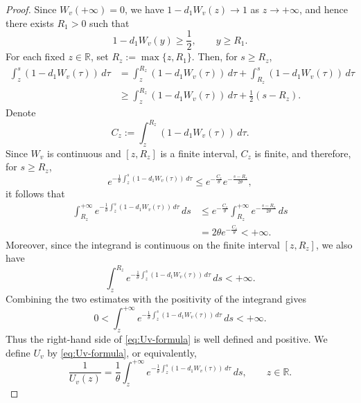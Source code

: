\documentclass[preprint,sort&compress,final,12pt]{elsarticle}
\numberwithin{equation}{section}
\begin{document}
\begin{proof}
Since $W_v(+\infty)=0$, we have $1-d_1W_v(z)\to1$ as $z\to+\infty$, and hence there exists $R_1>0$ such that
\begin{equation*}
1-d_1W_v(y)\ge\frac12,\qquad y\ge R_1.
\end{equation*}
For each fixed $z\in\mathbb R$, set $R_z:=\max\{z,R_1\}$. Then, for $s\ge R_z$,
\begin{align*}
\int_z^s(1-d_1W_v(\tau))\,d\tau
&=\int_z^{R_z}(1-d_1W_v(\tau))\,d\tau+
\int_{R_z}^s(1-d_1W_v(\tau))\,d\tau\\
&\ge \int_z^{R_z}(1-d_1W_v(\tau))\,d\tau
+\frac12(s-R_z).
\end{align*}
Denote
\begin{equation*}
C_z:=\int_z^{R_z}(1-d_1W_v(\tau))\,d\tau.
\end{equation*}
Since $W_v$ is continuous and $[z,R_z]$ is a finite interval, $C_z$ is finite, and therefore, for $s\ge R_z$,
\begin{equation*}
e^{-\frac{1}{\theta}\int_z^s(1-d_1W_v(\tau))\,d\tau}\le
e^{-\frac{C_z}{\theta}}e^{-\frac{s-R_z}{2\theta}},
\end{equation*}
it follows that
\begin{align*}
\int_{R_z}^{+\infty}e^{-\frac{1}{\theta}\int_z^s(1-d_1W_v(\tau))\,d\tau}\,ds
&\le e^{-\frac{C_z}{\theta}}\int_{R_z}^{+\infty}e^{-\frac{s-R_z}{2\theta}}\,ds\\
&=2\theta e^{-\frac{C_z}{\theta}}<+\infty.
\end{align*}
Moreover, since the integrand is continuous on the finite interval $[z,R_z]$, we also have
\begin{equation*}
\int_z^{R_z}e^{-\frac{1}{\theta}\int_z^s(1-d_1W_v(\tau))\,d\tau}\,ds<+\infty.
\end{equation*}
Combining the two estimates with the positivity of the integrand gives
\begin{equation*}
0<\int_z^{+\infty}e^{-\frac{1}{\theta}\int_z^s(1-d_1W_v(\tau))\,d\tau}\,ds<+\infty.
\end{equation*}
Thus the right-hand side of \eqref{eq:Uv-formula} is well defined and positive. We define $U_v$ by \eqref{eq:Uv-formula}, or equivalently,
\begin{equation}\label{eq:Uv-reciprocal-formula}
\frac{1}{U_v(z)}=\frac{1}{\theta}\int_z^{+\infty}e^{-\frac{1}{\theta}\int_z^s(1-d_1W_v(\tau))\,d\tau}\,ds,\qquad z\in\mathbb R.
\end{equation}


\end{proof}
\end{document}

